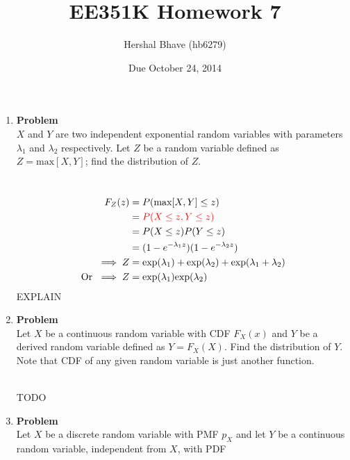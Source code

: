 \documentclass[12pt]{article}
\title{EE351K Homework 7}
\author{Hershal Bhave (hb6279)}
\date{Due October 24, 2014}
\newenvironment{Ex}{\textbf{Problem}\vspace{.75em}\\}{}
\begin{document}
\maketitle
\begin{enumerate}
\item
  \begin{Ex}
    $X$ and $Y$ are two independent exponential random variables with
    parameters $\lambda_1$ and $\lambda_2$ respectively. Let $Z$ be a
    random variable defined as $Z = \text{max}[X,Y]$; find the
    distribution of $Z$.
    \begin{solution} \hfill \vspace{.75em} \\
      \begin{equation}
        \label{eq:1-sol}
        \begin{aligned}
          F_Z(z) &= P(\text{max}[X,Y] \le z) \\
          &= {\color{red} P(X \le z, Y \le z)} \\
          &= P(X\le z)P(Y\le z) \\
          &= (1-e^{-\lambda_1 z})(1-e^{-\lambda_2 z}) \\
          \implies Z &= \text{exp}(\lambda_1) + \text{exp}(\lambda_2)
          + \text{exp}(\lambda_1 + \lambda_2) \\
          \text{Or }\implies Z &=
          \text{exp}(\lambda_1)\text{exp}(\lambda_2) \\
        \end{aligned}
      \end{equation}
      {\color{red} \huge EXPLAIN}
    \end{solution}
  \end{Ex}
\item
  \begin{Ex}
    Let $X$ be a continuous random variable with CDF $F_X(x)$ and $Y$
    be a derived random variable defined as $Y = F_X(X)$. Find the
    distribution of $Y$.  Note that CDF of any given random variable
    is just another function.
    \begin{solution} \hfill \vspace{.75em} \\
      {\color{red} \huge TODO}
    \end{solution}
  \end{Ex}
\item
  \begin{Ex}
    Let $X$ be a discrete random variable with PMF $p_X$ and let $Y$
    be a continuous random variable, independent from $X$, with PDF

\end{Ex}
\end{enumerate}
\end{document}
